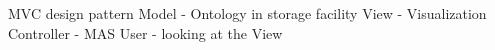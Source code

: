 MVC design pattern
Model - Ontology in storage facility
View - Visualization
Controller - MAS
User - looking at the View
    